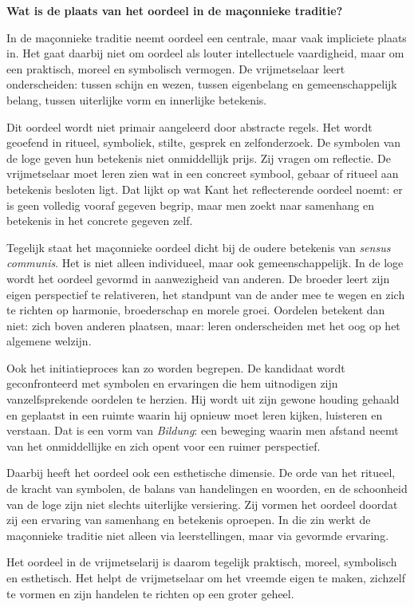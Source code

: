 \documentclass[11pt,twoside,openright]{memoir}
\begin{document}
\bigskip
\noindent
\textbf{Wat is de plaats van het oordeel in de maçonnieke traditie?}
\medskip

In de maçonnieke traditie neemt oordeel een centrale, maar vaak impliciete plaats in. Het gaat daarbij niet om oordeel als louter intellectuele vaardigheid, maar om een praktisch, moreel en symbolisch vermogen. De vrijmetselaar leert onderscheiden: tussen schijn en wezen, tussen eigenbelang en gemeenschappelijk belang, tussen uiterlijke vorm en innerlijke betekenis.

Dit oordeel wordt niet primair aangeleerd door abstracte regels. Het wordt geoefend in ritueel, symboliek, stilte, gesprek en zelfonderzoek. De symbolen van de loge geven hun betekenis niet onmiddellijk prijs. Zij vragen om reflectie. De vrijmetselaar moet leren zien wat in een concreet symbool, gebaar of ritueel aan betekenis besloten ligt. Dat lijkt op wat Kant het reflecterende oordeel noemt: er is geen volledig vooraf gegeven begrip, maar men zoekt naar samenhang en betekenis in het concrete gegeven zelf.

Tegelijk staat het maçonnieke oordeel dicht bij de oudere betekenis van \textit{sensus communis}. Het is niet alleen individueel, maar ook gemeenschappelijk. In de loge wordt het oordeel gevormd in aanwezigheid van anderen. De broeder leert zijn eigen perspectief te relativeren, het standpunt van de ander mee te wegen en zich te richten op harmonie, broederschap en morele groei. Oordelen betekent dan niet: zich boven anderen plaatsen, maar: leren onderscheiden met het oog op het algemene welzijn.

Ook het initiatieproces kan zo worden begrepen. De kandidaat wordt geconfronteerd met symbolen en ervaringen die hem uitnodigen zijn vanzelfsprekende oordelen te herzien. Hij wordt uit zijn gewone houding gehaald en geplaatst in een ruimte waarin hij opnieuw moet leren kijken, luisteren en verstaan. Dat is een vorm van \textit{Bildung}: een beweging waarin men afstand neemt van het onmiddellijke en zich opent voor een ruimer perspectief.

Daarbij heeft het oordeel ook een esthetische dimensie. De orde van het ritueel, de kracht van symbolen, de balans van handelingen en woorden, en de schoonheid van de loge zijn niet slechts uiterlijke versiering. Zij vormen het oordeel doordat zij een ervaring van samenhang en betekenis oproepen. In die zin werkt de maçonnieke traditie niet alleen via leerstellingen, maar via gevormde ervaring.

Het oordeel in de vrijmetselarij is daarom tegelijk praktisch, moreel, symbolisch en esthetisch. Het helpt de vrijmetselaar om het vreemde eigen te maken, zichzelf te vormen en zijn handelen te richten op een groter geheel.
\end{document}
